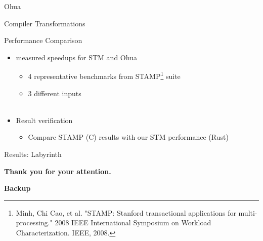 \documentclass[aspectratio=169, usenames, dvipsnames]{beamer}
\begin{document}
\begin{frame}{Ohua\footnotemark[2]}
\end{frame}

\begin{frame}{Compiler Transformations}
\end{frame}

\begin{frame}{Performance Comparison}
    \begin{itemize}
        \item measured speedups for STM and Ohua
            \begin{itemize}
                \item<2-> 4 representative benchmarks from STAMP\footnote[3]{Minh, Chi Cao, et al. "STAMP: Stanford transactional applications for multi-processing." 2008 IEEE International Symposium on Workload Characterization. IEEE, 2008.} suite
                \item<3-> 3 different inputs\\ \ 
            \end{itemize}
        \item<4-> Result verification
            \begin{itemize}
                \item<4-> Compare STAMP (C) results with our STM performance (Rust)
            \end{itemize}
        \end{itemize}
\end{frame}

\begin{frame}{Results: Labyrinth}
    \
\end{frame}

\begin{frame}
  \centering
  \huge
  \alert{\textbf{Thank you for your attention.}}
\end{frame}


\begin{frame}
  \centering
  \huge
  \alert{\textbf{Backup}}
\end{frame}
\end{document}
